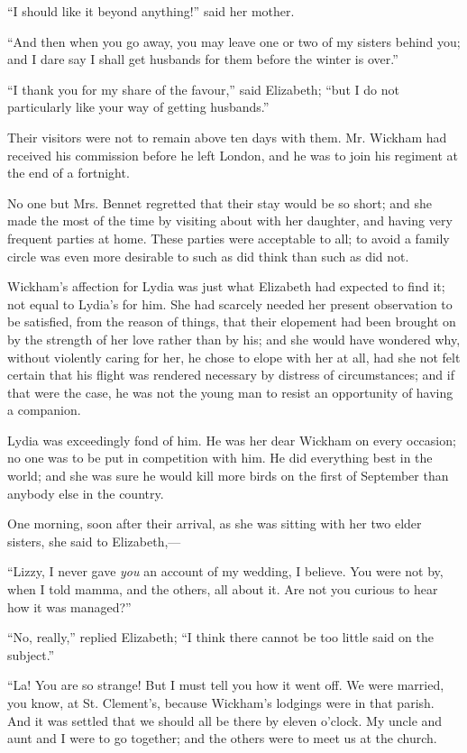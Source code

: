 ``I should like it beyond anything!'' said her mother.

``And then when you go away, you may leave one or two of my sisters behind you; and I dare say I shall get husbands for them before the winter is over.''

``I thank you for my share of the favour,'' said Elizabeth; ``but I do not particularly like your way of getting husbands.''

Their visitors were not to remain above ten days with them. Mr. Wickham had received his commission before he left London, and he was to join his regiment at the end of a fortnight.

No one but Mrs. Bennet regretted that their stay would be so short; and she made the most of the time by visiting about with her daughter, and having very frequent parties at home. These parties were acceptable to all; to avoid a family circle was even more desirable to such as did think than such as did not.

Wickham's affection for Lydia was just what Elizabeth had expected to find it; not equal to Lydia's for him. She had scarcely needed her present observation to be satisfied, from the reason of things, that their elopement had been brought on by the strength of her love rather than by his; and she would have wondered why, without violently caring for her, he chose to elope with her at all, had she not felt certain that his flight was rendered necessary by distress of circumstances; and if that were the case, he was not the young man to resist an opportunity of having a companion.

Lydia was exceedingly fond of him. He was her dear Wickham on every occasion; no one was to be put in competition with him. He did everything best in the world; and she was sure he would kill more birds on the first of September than anybody else in the country.

One morning, soon after their arrival, as she was sitting with her two elder sisters, she said to Elizabeth,---

``Lizzy, I never gave \textit{you} an account of my wedding, I believe. You were not by, when I told mamma, and the others, all about it. Are not you curious to hear how it was managed?''

``No, really,'' replied Elizabeth; ``I think there cannot be too little said on the subject.''

``La! You are so strange! But I must tell you how it went off. We were married, you know, at St. Clement's, because Wickham's lodgings were in that parish. And it was settled that we should all be there by eleven o'clock. My uncle and aunt and I were to go together; and the others were to meet us at the church.

